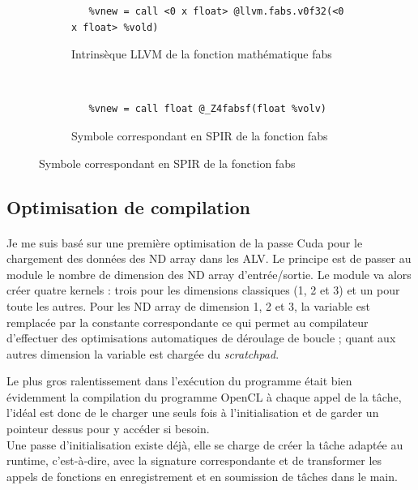 \begin{figure}[h!]
   \begin{subfigure}{135mm}
      \begin{lstlisting}
   %vnew = call <0 x float> @llvm.fabs.v0f32(<0 x float> %vold)
      \end{lstlisting}
      \caption{Intrinsèque LLVM de la fonction mathématique fabs}
   \end{subfigure}
   \\[5mm]
   \begin{subfigure}{135mm}
      \begin{lstlisting}
   %vnew = call float @_Z4fabsf(float %volv)
      \end{lstlisting}
      \caption{Symbole correspondant en SPIR de la fonction fabs}
   \end{subfigure}
\end{figure}

\subsection{Optimisation de compilation}
\paragraph{}
Je me suis basé sur une première optimisation de la passe Cuda pour le
chargement des données des ND array dans les ALV. Le principe est de passer au
module le nombre de dimension des ND array d'entrée/sortie. Le module va alors
créer quatre kernels : trois pour les dimensions classiques (1, 2 et 3) et un
pour toute les autres. Pour les ND array de dimension 1, 2 et 3, la variable est
remplacée par la constante correspondante ce qui permet au compilateur
d'effectuer des optimisations automatiques de déroulage de boucle ; quant aux
autres dimension la variable est chargée du \emph{scratchpad}.

Le plus gros ralentissement dans l'exécution du programme était bien évidemment
la compilation du programme OpenCL à chaque appel de la tâche, l'idéal est donc
de le charger une seuls fois à l'initialisation et de garder un pointeur dessus
pour y accéder si besoin.\\
Une passe d'initialisation existe déjà, elle se charge de créer la tâche adaptée
au runtime, c'est-à-dire, avec la signature correspondante et de transformer les
appels de fonctions en enregistrement et en soumission de tâches dans le main.

